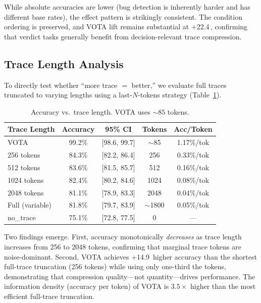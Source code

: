 \documentclass[11pt]{article}
\newcommand{\vota}{\textsc{VOTA}}
\newcommand{\pp}{\,\text{pp}}
\begin{document}
While absolute accuracies are lower (bug detection is inherently harder and has different base rates), the effect pattern is strikingly consistent. The condition ordering is preserved, and \vota{} lift remains substantial at +22.4\pp{}, confirming that verdict tasks generally benefit from decision-relevant trace compression.

\subsection{Trace Length Analysis}

To directly test whether ``more trace $=$ better,'' we evaluate full traces truncated to varying lengths using a last-$N$-tokens strategy (Table~\ref{tab:length}).

\begin{table}[t]
\centering
\caption{Accuracy vs.\ trace length. \vota{} uses ${\sim}85$ tokens.}
\label{tab:length}
\small
\begin{tabular}{lcccc}
\toprule
\textbf{Trace Length} & \textbf{Accuracy} & \textbf{95\% CI} & \textbf{Tokens} & \textbf{Acc/Token} \\
\midrule
\vota{} & 99.2\% & [98.6, 99.7] & $\sim$85 & 1.17\%/tok \\
256 tokens & 84.3\% & [82.2, 86.4] & 256 & 0.33\%/tok \\
512 tokens & 83.6\% & [81.5, 85.7] & 512 & 0.16\%/tok \\
1024 tokens & 82.4\% & [80.2, 84.6] & 1024 & 0.08\%/tok \\
2048 tokens & 81.1\% & [78.9, 83.3] & 2048 & 0.04\%/tok \\
Full (variable) & 81.8\% & [79.7, 83.9] & $\sim$1800 & 0.05\%/tok \\
no\_trace & 75.1\% & [72.8, 77.5] & 0 & --- \\
\bottomrule
\end{tabular}
\end{table}

Two findings emerge. First, accuracy monotonically \emph{decreases} as trace length increases from 256 to 2048 tokens, confirming that marginal trace tokens are noise-dominant. Second, \vota{} achieves +14.9\pp{} higher accuracy than the shortest full-trace truncation (256 tokens) while using only one-third the tokens, demonstrating that compression quality---not quantity---drives performance. The information density (accuracy per token) of \vota{} is $3.5{\times}$ higher than the most efficient full-trace truncation.
\end{document}
